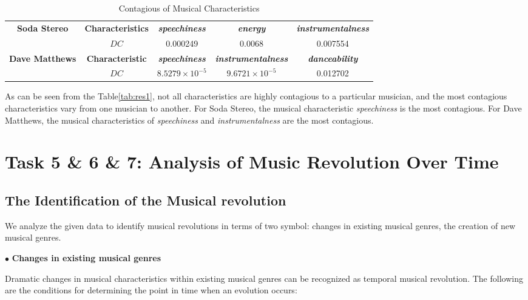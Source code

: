 \documentclass[12pt]{article}  %
\begin{document}
\vspace{-0.5cm}
\begin{table}[htbp]
	\centering
	\caption{Contagious of Musical Characteristics}
	\begin{tabular}{c|c|c|c|c}
		\hline
		\hline
		\multirow{2}[4]{*}{\textbf{Soda Stereo}} & \textbf{Characteristics} & \textit{\textbf{speechiness}} & \textit{\textbf{energy}} & \textit{\textbf{instrumentalness}} \\
		\cline{2-5}                         & \textbf{$DC$}          & 0.000249             & 0.0068               & 0.007554 \\
		\hline
		\hline
		\multirow{2}[4]{*}{\textbf{Dave Matthews}} & \textbf{Characteristic} & \textit{\textbf{speechiness}} & \textit{\textbf{instrumentalness}} & \textit{\textbf{danceability}} \\
		\cline{2-5}                         & \textbf{$DC$}          & $8.5279\times 10^{-5}$      & $9.6721\times10^{-5}$      & 0.012702 \\
		\hline
		\hline
	\end{tabular}%
	\label{tab:res1}%
\end{table}%
As can be seen from the Table\eqref{tab:res1}, not all characteristics are highly contagious to a particular musician, and the most contagious characteristics vary from one musician to another. For Soda Stereo, the musical characteristic \emph{speechiness} is the most contagious. For Dave Matthews, the musical characteristics of \emph{speechiness} and \emph{instrumentalness} are the most contagious.
\vspace{-0.5cm}
\section{Task 5 \& 6 \& 7: Analysis of Music Revolution Over Time}
\vspace{-0.3cm}
\subsection{The Identification of the Musical revolution}

\vspace{-0.2cm}
We analyze the given data to identify musical revolutions in terms of two symbol: changes in existing musical genres, the creation of new musical genres.

$\bullet$ \textbf{Changes in existing musical genres}

Dramatic changes in musical characteristics within existing musical genres can be recognized as temporal musical revolution. The following are the conditions for determining the point in time when an evolution occurs:
\end{document}
